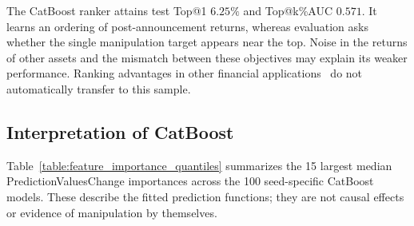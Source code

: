 \documentclass{ieeeaccess}
\begin{document}
\textcolor{revisionblue}{The CatBoost ranker attains test Top@1 $6.25\%$ and Top@k\%AUC $0.571$. It learns an ordering of post-announcement returns, whereas evaluation asks whether the single manipulation target appears near the top. Noise in the returns of other assets and the mismatch between these objectives may explain its weaker performance. Ranking advantages in other financial applications~\cite{poh_ltr} do not automatically transfer to this sample.}

\subsection{\textcolor{revisionblue}{Interpretation of CatBoost}}
\textcolor{revisionblue}{Table~\ref{table:feature_importance_quantiles} summarizes the 15 largest median PredictionValuesChange importances across the 100 seed-specific CatBoost models. These describe the fitted prediction functions; they are not causal effects or evidence of manipulation by themselves.}
\end{document}
